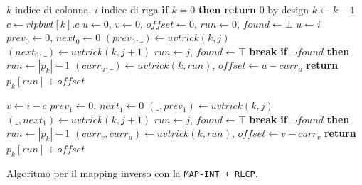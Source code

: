 \begin{algorithm}
  \begin{algorithmic}[1]
    \Comment $k$ indice di colonna, $i$ indice di riga
    \State \textbf{if} $k=0$ \textbf{then} \textbf{return} $0$
    \Comment by design
    \State $k\gets k-1$
    \State $c\gets rlpbwt[k].c$
    \State $u\gets 0$, $v\gets 0$, $offset\gets 0$, $run \gets 0$,
    $found\gets \bot$
    \State $u\gets i$
    \State $prev_0\gets 0$, $next_0\gets 0$
    \For {\textit{every} $j\in [0,|p_k|)$}
    \State $(prev_0,\_) \gets uvtrick(k,j)$
    \State $(next_0,\_) \gets uvtrick(k,j+1)$
    \State $run\gets j$, $found\gets \top$
    \State \textbf{break}
    \EndIf
    \EndFor
    \State \textbf{if} $\neg found$ \textbf{then} $run \gets |p_k|-1$
    \State $(curr_u,\_)\gets uvtrick(k, run)$, $offset\gets u-curr_u$
    \State \textbf{return} $p_k[run]+offset$
    \Else

    \State $v\gets i-c$
    \State $prev_1\gets 0$, $next_1\gets 0$
    \For {\textit{every} $j\in [0,|p_k|)$}
    \State $(\_,prev_1) \gets uvtrick(k,j)$
    \State $(\_,next_1) \gets uvtrick(k,j+1)$
    \State $run\gets j$, $found\gets \top$
    \State \textbf{break}
    \EndIf
    \EndFor
    \State \textbf{if} $\neg found$ \textbf{then} $run \gets |p_k|-1$
    \State $(curr_v,curr_u)\gets uvtrick(k, run)$, $offset\gets v-curr_v$
    \State \textbf{return} $p_k[run]+offset$
    \EndIf
    \EndFunction
  \end{algorithmic}
  \caption{Algoritmo per il mapping inverso con la \texttt{MAP-INT + RLCP}.}
  \label{algo:lfrev}
\end{algorithm}

